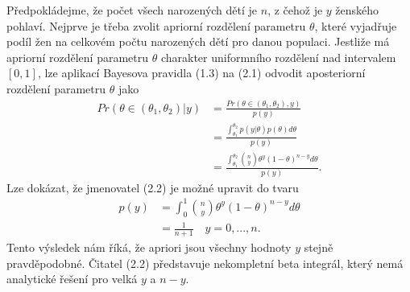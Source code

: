 Předpokládejme, že počet všech narozených dětí je $n$, z čehož je $y$ ženského pohlaví. Nejprve je třeba zvolit apriorní rozdělení parametru $\theta$, které vyjadřuje podíl žen na celkovém počtu narozených dětí pro danou populaci. Jestliže má apriorní rozdělení parametru $\theta$ charakter uniformního rozdělení nad intervalem $[0, 1]$, lze aplikací Bayesova pravidla (1.3) na (2.1) odvodit aposteriorní rozdělení parametru $\theta$ jako 
\begin{equation}
\begin{split}
Pr(\theta \in (\theta_1, \theta_2) | y) & = \frac{Pr(\theta \in (\theta_1, \theta_2), y)}{p(y)}\\
 & = \frac{\int_{\theta_1}^{\theta_2} p(y|\theta)p(\theta)d\theta}{p(y)}\\
 & = \frac{\int_{\theta_1}^{\theta_2} {n \choose y} \theta^y (1 - \theta) ^ {n - y}d \theta}{p(y)}.
\end{split}
\end{equation}
Lze dokázat, že jmenovatel (2.2) je možné upravit do tvaru
\begin{equation}
\begin{split}
p(y) &= \int_0^1 {n \choose y} \theta^y (1 - \theta)^{n - y}d\theta\\
 & = \frac{1}{n + 1} \quad y = 0, ..., n.
\end{split}
\end{equation}
Tento výsledek nám říká, že apriori jsou všechny hodnoty $y$ stejně pravděpodobné. Čitatel (2.2) představuje nekompletní beta integrál, který nemá analytické řešení pro velká $y$ a $n - y$.

